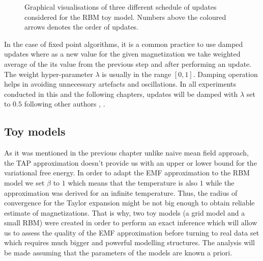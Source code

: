 \documentclass[../report/report.tex]{subfiles}
\begin{document}
\begin{figure}[!htb]
\begin{center}
\end{center}
\endminipage\hfill
 \caption[1]{Graphical visualisations of three different schedule of updates considered for the RBM toy model. Numbers above the coloured arrows denotes the order of updates.}
\label{fig:updates}
\end{figure}
\newpage

In the case of fixed point algorithms, it is a common practice to use damped updates \cite{murphy2012machine} where as a new value for the given magnetization we take weighted average of the its value from the previous step and after performing an update. The weight hyper-parameter $\lambda$ is usually in the range $[0,1]$. Damping operation helps in avoiding unnecessary artefacts and oscillations. In all experiments conducted in this and the following chapters, updates will be damped with $\lambda$ set to $0.5$ following other authors \cite{gabrie2015training}, \cite{welling2002new}.

\subsection{Toy models}
As it was mentioned in the previous chapter unlike naive mean field approach, the TAP approximation doesn't provide us with an upper or lower bound for the variational free energy. In order to adapt the EMF approximation to the RBM model we set $\beta$ to $1$ which means that the temperature is also $1$ while the approximation was derived for an infinite temperature. Thus, the radius of convergence for the Taylor expansion might be not big enough to obtain reliable estimate of magnetizations. That is why, two toy models (a grid model and a small RBM) were created in order to perform an exact inference which will allow us to assess the quality of the EMF approximation before turning to real data set which requires much bigger and powerful modelling structures. The analysis will be made assuming that the parameters of the models are known a priori.
\end{document}
